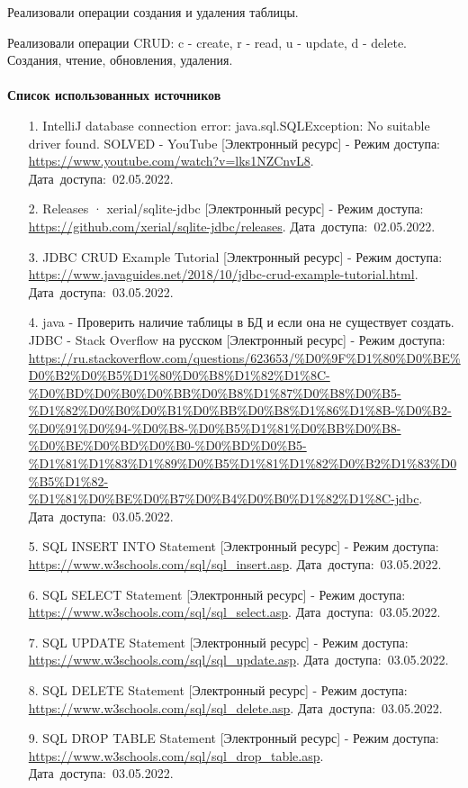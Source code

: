 \documentclass[12pt, a4paper, simple]{eskdtext}
\begin{document}
    Реализовали операции создания и удаления таблицы.

    Реализовали операции CRUD: c - create, r - read, u - update, d - delete.
    Создания, чтение, обновления, удаления.
    
    \paragraph{} \textbf{Список использованных источников}
    \begin{enumerate}
        \item[1.] IntelliJ database connection error: java.sql.SQLException: No suitable driver found. SOLVED - YouTube [Электронный ресурс]
        - Режим доступа: \url{https://www.youtube.com/watch?v=lks1NZCnvL8}.
        Дата~доступа:~02.05.2022.
        \item[2.] Releases · xerial/sqlite-jdbc [Электронный ресурс]
        - Режим доступа: \url{https://github.com/xerial/sqlite-jdbc/releases}.
        Дата~доступа:~02.05.2022.
        \item[3.] JDBC CRUD Example Tutorial [Электронный ресурс]
        - Режим доступа: \url{https://www.javaguides.net/2018/10/jdbc-crud-example-tutorial.html}.
        Дата~доступа:~03.05.2022.
        \item[4.] java - Проверить наличие таблицы в БД и если она не существует создать. JDBC - Stack Overflow на русском [Электронный ресурс]
        - Режим доступа: \url{https://ru.stackoverflow.com/questions/623653/%D0%9F%D1%80%D0%BE%D0%B2%D0%B5%D1%80%D0%B8%D1%82%D1%8C-%D0%BD%D0%B0%D0%BB%D0%B8%D1%87%D0%B8%D0%B5-%D1%82%D0%B0%D0%B1%D0%BB%D0%B8%D1%86%D1%8B-%D0%B2-%D0%91%D0%94-%D0%B8-%D0%B5%D1%81%D0%BB%D0%B8-%D0%BE%D0%BD%D0%B0-%D0%BD%D0%B5-%D1%81%D1%83%D1%89%D0%B5%D1%81%D1%82%D0%B2%D1%83%D0%B5%D1%82-%D1%81%D0%BE%D0%B7%D0%B4%D0%B0%D1%82%D1%8C-jdbc}.
        Дата~доступа:~03.05.2022.
        \item[5.] SQL INSERT INTO Statement [Электронный ресурс]
        - Режим доступа: \url{https://www.w3schools.com/sql/sql_insert.asp}.
        Дата~доступа:~03.05.2022.
        \item[6.] SQL SELECT Statement [Электронный ресурс]
        - Режим доступа: \url{https://www.w3schools.com/sql/sql_select.asp}.
        Дата~доступа:~03.05.2022.
        \item[7.] SQL UPDATE Statement [Электронный ресурс]
        - Режим доступа: \url{https://www.w3schools.com/sql/sql_update.asp}.
        Дата~доступа:~03.05.2022.
        \item[8.] SQL DELETE Statement [Электронный ресурс]
        - Режим доступа: \url{https://www.w3schools.com/sql/sql_delete.asp}.
        Дата~доступа:~03.05.2022.
        \item[9.] SQL DROP TABLE Statement [Электронный ресурс]
        - Режим доступа: \url{https://www.w3schools.com/sql/sql_drop_table.asp}.
        Дата~доступа:~03.05.2022.
    \end{enumerate}
    \newpage
\end{document}
